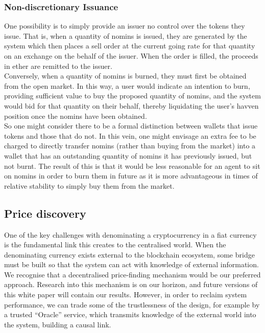 \subsubsection{Non-discretionary Issuance}

One possibility is to simply provide an issuer no control over the tokens they issue. That is, when a quantity of nomins is issued, they are generated by the system which then places a sell order at the current going rate for that quantity on an exchange on the behalf of the issuer. When the order is filled, the proceeds in ether are remitted to the issuer. \\

\noindent Conversely, when a quantity of nomins is burned, they must first be obtained from the open market. In this way, a user would indicate an intention to burn, providing sufficient value to buy the proposed quantity of nomins, and the system would bid for that quantity on their behalf, thereby liquidating the user's havven position once the nomins have been obtained. \\

\noindent So one might consider there to be a formal distinction between wallets that issue tokens and those that do not. In this vein, one might envisage an extra fee to be charged to directly transfer nomins (rather than buying from the market) into a wallet that has an outstanding quantity of nomins it has previously issued, but not burnt. The result of this is that it would be less reasonable for an agent to sit on nomins in order to burn them in future as it is more advantageous in times of relative stability to simply buy them from the market. \\

\pagebreak 

\subsection{Price discovery}

One of the key challenges with denominating a cryptocurrency in a fiat currency is the
fundamental link this creates to the centralised world. When the denominating currency exists
external to the blockchain ecosystem, some bridge must be built so that the system can act with
knowledge of external information.
We recognise that a decentralised price-finding mechanism would be our preferred approach.
Research into this mechanism is on our horizon, and future versions of this white paper will contain
our results.
However, in order to reclaim system performance, we can trade some of the trustlessness of the design, for example by
a trusted ``Oracle'' service, which transmits knowledge of the external world into the system, building a causal link.



